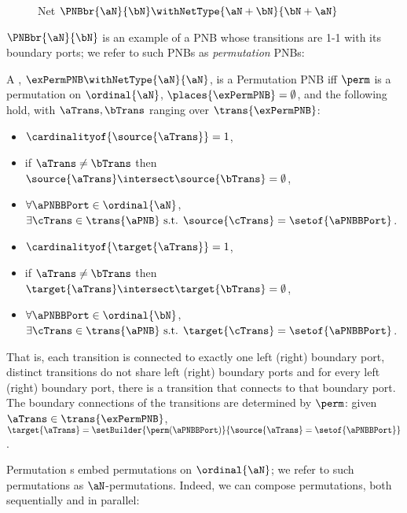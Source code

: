 \begin{figure}[ht]
    \centering
    \drawBraid[\aN][\bN][\bN][\aN]
\caption{Net $\PNBbr{\aN}{\bN} \withNetType{\aN + \bN}{\bN + \aN}$}
\label{fig:netBr}
\end{figure}

$\PNBbr{\aN}{\bN}$ is an example of a PNB whose transitions are 1-1 with its
boundary ports; we refer to such PNBs as \emph{permutation} PNBs:

\begin{definition}
    A \PNB, $\exPermPNB \withNetType{\aN}{\aN}$, is a Permutation PNB iff
    $\perm$ is a permutation on $\ordinal{\aN}$, $\places{\exPermPNB} =
    \emptyset$, and the following hold, with $\aTrans,\bTrans$
    ranging over $\trans{\exPermPNB}$:
    \begin{multicols}{2}
    \begin{itemize}
        \item $\cardinalityof{\source{\aTrans}} = 1$,
        \item if $\aTrans \neq \bTrans$ then $\source{\aTrans} \intersect
            \source{\bTrans} = \emptyset$,
        \item $\forall \aPNBBPort \in \ordinal{\aN}$, $\exists
            \cTrans \in \trans{\aPNB} \text{ s.t. }
            \source{\cTrans} = \setof{\aPNBBPort}$.
        \item $\cardinalityof{\target{\aTrans}} = 1$,
        \item if $\aTrans \neq \bTrans$ then $\target{\aTrans}
            \intersect \target{\bTrans} = \emptyset$,
        \item $\forall \aPNBBPort \in \ordinal{\bN}$, $\exists
            \cTrans \in \trans{\aPNB} \text{ s.t. }
            \target{\cTrans} = \setof{\aPNBBPort}$.
    \end{itemize}
    \end{multicols}
    That is, each transition is connected to exactly one left (right) boundary
    port, distinct transitions do not share left (right) boundary ports and for
    every left (right) boundary port, there is a transition that connects to
    that boundary port. The boundary connections of the transitions are
    determined by $\perm$: given $\aTrans \in \trans{\exPermPNB}$,
    $\target{\aTrans} = \setBuilder{\perm(\aPNBBPort)}{\source{\aTrans} =
    \setof{\aPNBBPort}}$.
\end{definition}

Permutation \PNB{}s embed permutations on $\ordinal{\aN}$; we refer to such
permutations as $\aN$-permutations. Indeed, we can compose permutations, both
sequentially and in parallel:


